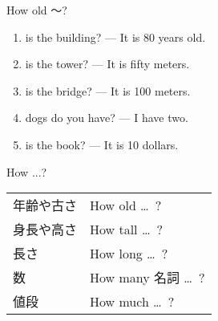 \documentclass[aspectratio=169,xcolor={dvipsnames,table}]{beamer}
\begin{document}
\begin{frame}[plain]{How old 〜?}
 \begin{enumerate}
  \item {} is the building? --- It is 80 years old.%
\hfill{}
  \item {}is the tower? --- It is fifty meters.%
\hfill{}
  \item {} is the bridge? --- It is 100 meters.
\hfill{}
  \item {} dogs do you have? --- I have two.
\hfill{}
  \item {} is the book? --- It is 10 dollars.
\hfill{}
 \end{enumerate}

\end{frame}
\begin{frame}[plain]{How ...?}
 
 \begin{center}
\begin{tabular}{ll}\toprule
年齢や古さ& How old \ldots{}\, ?\\
身長や高さ& How tall \ldots{}\, ?\\
長さ&How long \ldots{}\, ?\\
数&How many 名詞 \ldots{}\, ?\\
値段&How much \ldots{}\, ?\\
\bottomrule
\end{tabular}
\end{center}
\end{frame}
\end{document}
